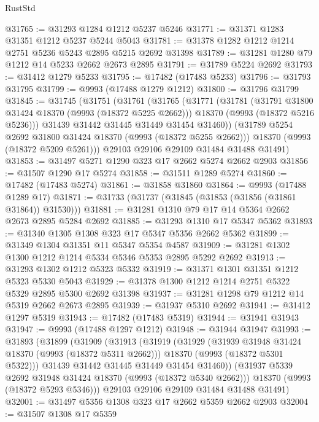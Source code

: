 \begin{lexlean}{RustStd}
\begin{coremodule}
@31765 := @31293 @1284 @1212 @5237 @5246
@31771 := @31371 @1283 @31351 @1212 @5237 @5244 @5043
@31781 := @31378 @1282 @1212 @1214 @2751 @5236 @5243 @2895 @5215 @2692 @31398
@31789 := @31281 @1280 @79 @1212 @14 @5233 @2662 @2673 @2895
@31791 := @31789 @5224 @2692
@31793 := @31412 @1279 @5233
@31795 := @17482 (@17483 @5233)
@31796 := @31793 @31795
@31799 := @9993 (@17488 @1279 @1212)
@31800 := @31796 @31799
@31845 := @31745
    (@31751
      (@31761
        (@31765
          (@31771
            (@31781
              (@31791 @31800 @31424 @18370 (@9993 (@18372 @5225 @2662)))
              @18370
              (@9993 (@18372 @5216 @5236)))
            @31439
            @31442
            @31445
            @31449
            @31454
            @31460))
        (@31789 @5254 @2692 @31800 @31424 @18370 (@9993 (@18372 @5255 @2662)))
        @18370
        (@9993 (@18372 @5209 @5261)))
      @29103
      @29106
      @29109
      @31484
      @31488
      @31491)
@31853 := @31497 @5271 @1290 @323 @17 @2662 @5274 @2662 @2903
@31856 := @31507 @1290 @17 @5274
@31858 := @31511 @1289 @5274
@31860 := @17482 (@17483 @5274)
@31861 := @31858 @31860
@31864 := @9993 (@17488 @1289 @17)
@31871 := @31733 (@31737 (@31845 (@31853 (@31856 (@31861 @31864)) @31530)))
@31881 := @31281 @1310 @79 @17 @14 @5364 @2662 @2673 @2895 @5284 @2692
@31885 := @31293 @1310 @17 @5347 @5362
@31893 := @31340 @1305 @1308 @323 @17 @5347 @5356 @2662 @5362
@31899 := @31349 @1304 @31351 @11 @5347 @5354 @4587
@31909 := @31281 @1302 @1300 @1212 @1214 @5334 @5346 @5353 @2895 @5292 @2692
@31913 := @31293 @1302 @1212 @5323 @5332
@31919 := @31371 @1301 @31351 @1212 @5323 @5330 @5043
@31929 := @31378 @1300 @1212 @1214 @2751 @5322 @5329 @2895 @5300 @2692 @31398
@31937 := @31281 @1298 @79 @1212 @14 @5319 @2662 @2673 @2895
@31939 := @31937 @5310 @2692
@31941 := @31412 @1297 @5319
@31943 := @17482 (@17483 @5319)
@31944 := @31941 @31943
@31947 := @9993 (@17488 @1297 @1212)
@31948 := @31944 @31947
@31993 := @31893
    (@31899
      (@31909
        (@31913
          (@31919
            (@31929
              (@31939 @31948 @31424 @18370 (@9993 (@18372 @5311 @2662)))
              @18370
              (@9993 (@18372 @5301 @5322)))
            @31439
            @31442
            @31445
            @31449
            @31454
            @31460))
        (@31937 @5339 @2692 @31948 @31424 @18370 (@9993 (@18372 @5340 @2662)))
        @18370
        (@9993 (@18372 @5293 @5346)))
      @29103
      @29106
      @29109
      @31484
      @31488
      @31491)
@32001 := @31497 @5356 @1308 @323 @17 @2662 @5359 @2662 @2903
@32004 := @31507 @1308 @17 @5359

\end{coremodule}
\end{lexlean}
